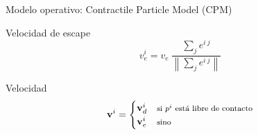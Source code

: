 \begin{frame}{Modelo operativo: Contractile Particle Model (CPM)}
{\begin{center}
\begin{minipage}[t]{0.30\textwidth}
\begin{block}{Velocidad de escape}
                \begin{equation*}
                    v_e^i = v_e\ \frac{\sum_{j} e^{i\ j}}{\left\| \sum_{j} e^{i\ j} \right\|}
                \end{equation*}
            \end{block}
        \end{minipage}
        \hfill
        \begin{minipage}[t]{0.30\textwidth}
            \begin{block}{Velocidad}
                \begin{equation*}
                    \mathbf{v}^i = \begin{cases}
                                       \mathbf{v}_d^i & \footnotesize{\text{si $p^i$ está libre de contacto}} \\
                                       \mathbf{v}_e^i & \footnotesize{\text{sino}}
                    \end{cases}
                \end{equation*}
            \end{block}
        \end{minipage}
    \end{center}
    }
\end{frame}


